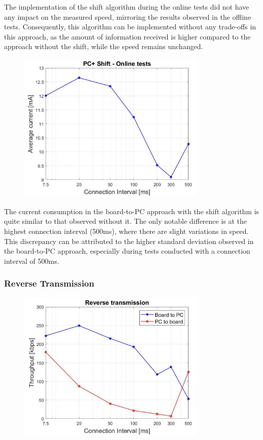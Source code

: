 \documentclass{Configuration_Files/PoliMi3i_thesis}
\begin{document}
The implementation of the shift algorithm during the online tests did not have any impact on the measured speed, mirroring the results observed in the offline tests. Consequently, this algorithm can be implemented without any trade-offs in this approach, as the amount of information received is higher compared to the approach without the shift, while the speed remains unchanged.

\begin{figure}[h!]
    \centering
    \includegraphics[width=0.8\textwidth]{Results Manuel/figure38}
    \label{fig:figure1}
\end{figure}

The current consumption in the board-to-PC approach with the shift algorithm is quite similar to that observed without it. The only notable difference is at the highest connection interval (500ms), where there are slight variations in speed. This discrepancy can be attributed to the higher standard deviation observed in the board-to-PC approach, especially during tests conducted with a connection interval of 500ms.

\subsubsection*{Reverse Transmission}

\begin{figure}[h!]
    \centering
    \includegraphics[width=0.8\textwidth]{Results Manuel/figure39}
    \label{fig:figure1}
\end{figure}
\end{document}
